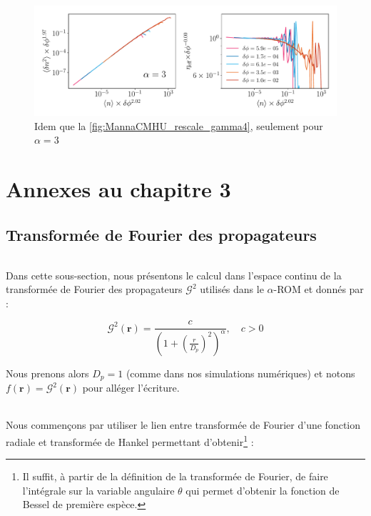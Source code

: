 \begin{figure}[H]
	\centering
	\includegraphics[width=\textwidth]{Chapitre2/Figures/Hyperuniformity/RescaleHU_MannaCM_Gamma3.pdf}
	\caption{Idem que la \autoref{fig:MannaCMHU_rescale_gamma4}, seulement pour $\alpha=3$}
	\label{fig:MannaCMHU_rescale_gamma3}
\end{figure}

\FloatBarrier

\chapter{Annexes au chapitre 3}

\section{Transformée de Fourier des propagateurs}

\label{sec:TFinverse_susp}

\subparagraph{}Dans cette sous-section, nous présentons le calcul dans l'espace continu de la transformée de Fourier des propagateurs $\mathcal{G}^2$ utilisés dans le $\alpha$-ROM et donnés par :

\begin{equation}
	\mathcal{G}^2(\mathbf{r}) = \frac{c}{\left(1+\left(\frac{r}{D_p}\right)^2\right)^\alpha}, \quad c > 0
\end{equation}

\noindent Nous prenons alors $D_p = 1$ (comme dans nos simulations numériques) et notons $f(\mathbf{r}) = \mathcal{G}^2(\mathbf{r})$ pour alléger l'écriture.

\subparagraph{}Nous commençons par utiliser le lien entre transformée de Fourier d'une fonction radiale et transformée de Hankel \cite{poularikas_transforms_2018} permettant d'obtenir\footnote{Il suffit, à partir de la définition de la transformée de Fourier, de faire l'intégrale sur la variable angulaire $\theta$ qui permet d'obtenir la fonction de Bessel de première espèce.} :

